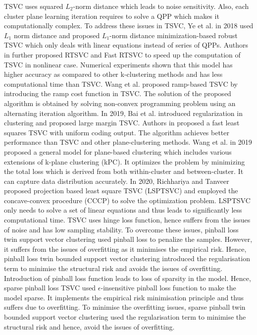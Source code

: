 \documentclass[pdflatex,sn-mathphys]{sn-jnl}%
\theoremstyle{thmstyleone}%
\theoremstyle{thmstyletwo}%
\theoremstyle{thmstylethree}%
\begin{document}
TSVC uses squared $L_2$-norm distance which leads to noise sensitivity. Also, each cluster plane learning iteration requires to solve a QPP which makes it computationally complex. To address these issues in TSVC, Ye et al. \cite{ye2018l1} in 2018 used $L_1$ norm distance and proposed $L_1$-norm distance minimization-based robust TSVC which only deals with linear equations instead of series of QPPs. Authors in \cite{ye2018l1} further proposed RTSVC and Fast RTSVC to speed up the computation of TSVC in nonlinear case. Numerical experiments shown that this model has higher accuracy as compared to other k-clustering methods and has less computational time than TSVC. Wang et al. \cite{rampwang2018} proposed ramp-based TSVC by introducing the ramp cost function in TSVC. The solution of the proposed algorithm is obtained by solving non-convex programming problem using an alternating iteration algorithm. In 2019, Bai et al. \cite{bai2019clustering} introduced regularization in clustering and proposed large margin TSVC. Authors in \cite{bai2019clustering}  proposed a fast least squares TSVC with uniform coding output. The algorithm achieves better performance than TSVC and other plane-clustering methods. Wang et al. \cite{wang2019general} in 2019 proposed a general model for plane-based clustering which includes various extensions of k-plane clustering (kPC). It optimizes the problem by minimizing the total loss which is derived from both within-cluster and between-cluster. It can capture data distribution accurately. In 2020, Richhariya and Tanveer \cite{richhariya2020least} proposed projection based least square TSVC (LSPTSVC) and employed the concave-convex procedure (CCCP) to solve the optimization problem. LSPTSVC only needs to solve a set of linear equations and thus leads to significantly less computational time. TSVC uses hinge loss function, hence suffers from the issues of noise and has low sampling stability. To overcome these issues, pinball loss twin support vector clustering \cite{tanveer2021pinball} used pinball loss to penalize the samples. However, it suffers from the issues of overfitting as it minimises the empirical risk. Hence, pinball loss twin bounded support vector clustering \cite{tanveer2021pinballcon} introduced the regularisation term to minimise the structural risk and avoids the issues of overfitting. 
Introduction of pinball loss function leads to loss of sparsity in the model. Hence, sparse pinball loss TSVC \cite{tanveer2021sparse,tanveertabish2021} used $\epsilon$-insensitive pinball loss function  to make the model sparse. It implements the empirical risk minimisation principle and thus suffers due to overfitting. To minimise the overfitting issues, sparse pinball twin bounded support vector clustering \cite{tanveer2021pinballbo} used the regularisation term to minimise the structural risk and hence, avoid the issues of overfitting.  
\end{document}
